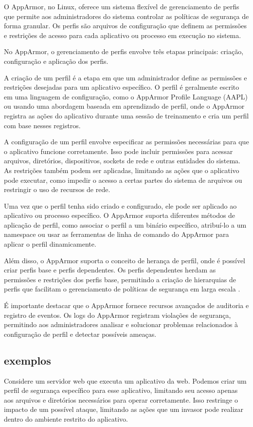 O AppArmor, no Linux, oferece um sistema flexível de gerenciamento de perfis que permite aos administradores do sistema controlar as políticas de segurança de forma granular. Os perfis são arquivos de configuração que definem as permissões e restrições de acesso para cada aplicativo ou processo em execução no sistema.

No AppArmor, o gerenciamento de perfis envolve três etapas principais: criação, configuração e aplicação dos perfis.

A criação de um perfil é a etapa em que um administrador define as permissões e restrições desejadas para um aplicativo específico. O perfil é geralmente escrito em uma linguagem de configuração, como o AppArmor Profile Language (AAPL) ou usando uma abordagem baseada em aprendizado de perfil, onde o AppArmor registra as ações do aplicativo durante uma sessão de treinamento e cria um perfil com base nesses registros.

A configuração de um perfil envolve especificar as permissões necessárias para que o aplicativo funcione corretamente. Isso pode incluir permissões para acessar arquivos, diretórios, dispositivos, sockets de rede e outras entidades do sistema. As restrições também podem ser aplicadas, limitando as ações que o aplicativo pode executar, como impedir o acesso a certas partes do sistema de arquivos ou restringir o uso de recursos de rede.

Uma vez que o perfil tenha sido criado e configurado, ele pode ser aplicado ao aplicativo ou processo específico. O AppArmor suporta diferentes métodos de aplicação de perfil, como associar o perfil a um binário específico, atribuí-lo a um namespace ou usar as ferramentas de linha de comando do AppArmor para aplicar o perfil dinamicamente.

Além disso, o AppArmor suporta o conceito de herança de perfil, onde é possível criar perfis base e perfis dependentes. Os perfis dependentes herdam as permissões e restrições dos perfis base, permitindo a criação de hierarquias de perfis que facilitam o gerenciamento de políticas de segurança em larga escala \cite{debian-handbook}.

É importante destacar que o AppArmor fornece recursos avançados de auditoria e registro de eventos. Os logs do AppArmor registram violações de segurança, permitindo aos administradores analisar e solucionar problemas relacionados à configuração de perfil e detectar possíveis ameaças. 

\subsection{exemplos}
 Considere um servidor web que executa um aplicativo da web. Podemos criar um perfil de segurança específico para esse aplicativo, limitando seu acesso apenas aos arquivos e diretórios necessários para operar corretamente. Isso restringe o impacto de um possível ataque, limitando as ações que um invasor pode realizar dentro do ambiente restrito do aplicativo.

